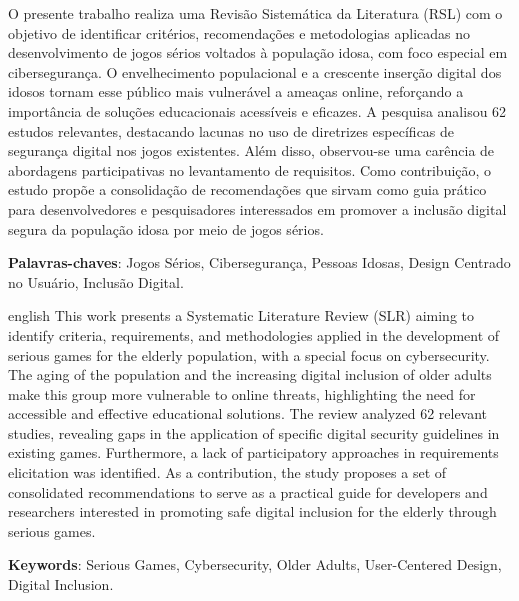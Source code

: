 
\setlength{\absparsep}{18pt} %
\begin{resumo}

O presente trabalho realiza uma Revisão Sistemática da Literatura (RSL) com o objetivo de identificar critérios, recomendações e metodologias aplicadas no desenvolvimento de jogos sérios voltados à população idosa, com foco especial em cibersegurança. O envelhecimento populacional e a crescente inserção digital dos idosos tornam esse público mais vulnerável a ameaças online, reforçando a importância de soluções educacionais acessíveis e eficazes. A pesquisa analisou 62 estudos relevantes, destacando lacunas no uso de diretrizes específicas de segurança digital nos jogos existentes. Além disso, observou-se uma carência de abordagens participativas no levantamento de requisitos. Como contribuição, o estudo propõe a consolidação de recomendações que sirvam como guia prático para desenvolvedores e pesquisadores interessados em promover a inclusão digital segura da população idosa por meio de jogos sérios.


 \textbf{Palavras-chaves}: Jogos Sérios, Cibersegurança, Pessoas Idosas, Design Centrado no Usuário, Inclusão Digital.
\end{resumo}

\begin{resumo}[Abstract]
 \begin{otherlanguage*}{english}
    This work presents a Systematic Literature Review (SLR) aiming to identify criteria, requirements, and methodologies applied in the development of serious games for the elderly population, with a special focus on cybersecurity. The aging of the population and the increasing digital inclusion of older adults make this group more vulnerable to online threats, highlighting the need for accessible and effective educational solutions. The review analyzed 62 relevant studies, revealing gaps in the application of specific digital security guidelines in existing games. Furthermore, a lack of participatory approaches in requirements elicitation was identified. As a contribution, the study proposes a set of consolidated recommendations to serve as a practical guide for developers and researchers interested in promoting safe digital inclusion for the elderly through serious games.

   \vspace{\onelineskip}
 
   \noindent 
   \textbf{Keywords}: Serious Games, Cybersecurity, Older Adults, User-Centered Design, Digital Inclusion.
 \end{otherlanguage*}
\end{resumo}